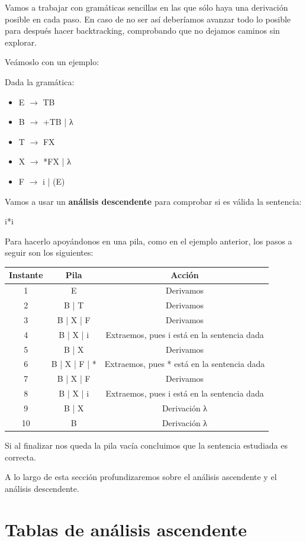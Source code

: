 \documentclass{apuntes}
\begin{document}
Vamos a trabajar con gramáticas sencillas en las que sólo haya una derivación posible en cada paso. En caso de no ser así deberíamos avanzar todo lo posible para después hacer backtracking, comprobando que no dejamos caminos sin explorar.

Veámoslo con un ejemplo:
\begin{example}
Dada la gramática:
\begin{itemize}
\item E $\rightarrow$ TB
\item B $\rightarrow$ +TB | λ
\item T $\rightarrow$ FX
\item X $\rightarrow$ *FX | λ
\item F $\rightarrow$ i | (E)
\end{itemize}
Vamos a usar un \textbf{análisis descendente} para comprobar si es válida la sentencia:
\begin{center}
i*i
\end{center}
Para hacerlo apoyándonos en una pila, como en el ejemplo anterior, los pasos a seguir son los siguientes:

\begin{tabular}{| c | c | c |}
\hline
Instante & Pila & Acción\\
\hline
1 & E & Derivamos\\
\hline
2 & B | T & Derivamos \\
\hline
3 & B | X | F & Derivamos\\
\hline
4 & B | X | i & Extraemos, pues i está en la sentencia dada\\
\hline
5 & B | X & Derivamos \\
\hline
6 & B | X | F | * & Extraemos, pues * está en la sentencia dada \\
\hline
7 & B | X | F & Derivamos \\
\hline
8 & B | X | i & Extraemos, pues i está en la sentencia dada \\
\hline
9 & B | X & Derivación λ\\
\hline
10 & B & Derivación λ \\
\hline
\end{tabular}

Si al finalizar nos queda la pila vacía concluimos que la sentencia estudiada es correcta.
\end{example}


A lo largo de esta sección profundizaremos sobre el análisis ascendente y el análisis descendente.


\section{Tablas de análisis ascendente}
\end{document}
